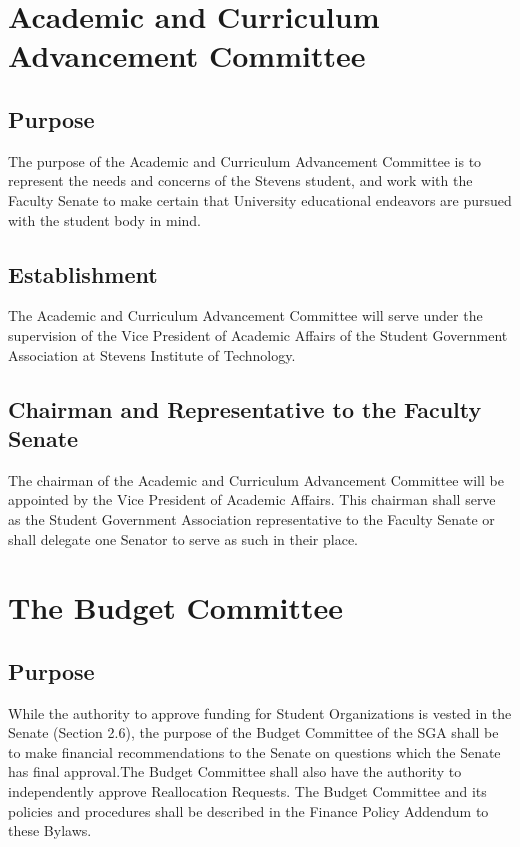 \documentclass[12pt]{scrreprt}
\begin{document}
\section{Academic and Curriculum Advancement Committee}

\subsection{Purpose}
The purpose of the Academic and Curriculum Advancement Committee is to represent
the needs and concerns of the Stevens student, and work with the Faculty Senate to
make certain that University educational endeavors are pursued with the student body
in mind.

\subsection{Establishment}
The Academic and Curriculum Advancement Committee will serve under the supervision
of the Vice President of Academic Affairs of the Student Government Association at
Stevens Institute of Technology. 

\subsection{Chairman and Representative to the Faculty Senate}
The chairman of the Academic and Curriculum Advancement Committee will be
appointed by the Vice President of Academic Affairs. This chairman shall serve as the
Student Government Association representative to the Faculty Senate or shall delegate
one Senator to serve as such in their place.

\section{The Budget Committee}

\subsection{Purpose}
While the authority to approve funding for Student Organizations is vested in the Senate (Section 2.6), the purpose of the Budget Committee of the SGA shall be to make financial recommendations to the Senate on questions which the Senate has final approval.The Budget Committee shall also have the authority to independently approve Reallocation Requests. The Budget Committee and its policies and procedures shall be described in the Finance Policy Addendum to these Bylaws.
\end{document}
